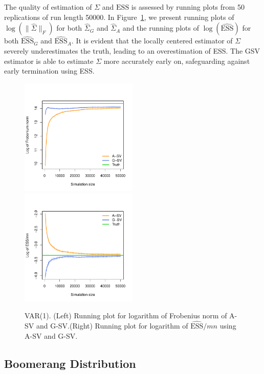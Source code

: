 \documentclass[11pt]{article}
\theoremstyle{remark}
\begin{document}
The quality of estimation of $\Sigma$ and $\text{ESS}$ is assessed by running plots from 50 replications of run length 50000. 
 In Figure~\ref{fig:var-frob_n_ess}, we present running plots of $\log(\|\hat{\Sigma}\|_F)$ for both $\hat{\Sigma}_G$ and $\hat{\Sigma}_A$ and the running plots of $\log(\widehat{\text{ESS}})$ for both  $\widehat{\text{ESS}}_G$ and $\widehat{\text{ESS}}_A$. It is evident that the locally centered estimator of $\Sigma$ severely underestimates the truth, leading to an overestimation of ESS. The GSV estimator is able to estimate $\Sigma$ more accurately early on, safeguarding against early termination using ESS. 
\begin{figure}[htbp]
    \centering
      \includegraphics[width = 2.2in]{plots/var-frob.pdf} 
      \includegraphics[width = 2.2in]{plots/var-ess.pdf}         
    \caption{VAR(1). (Left) Running plot for logarithm of Frobenius norm of A-SV and G-SV.(Right) Running plot for logarithm of $\widehat{\textrm{ESS}}/mn$ using A-SV and G-SV.}
    \label{fig:var-frob_n_ess}
\end{figure}






\subsection{Boomerang Distribution} \label{ex:boomerang}
\end{document}
